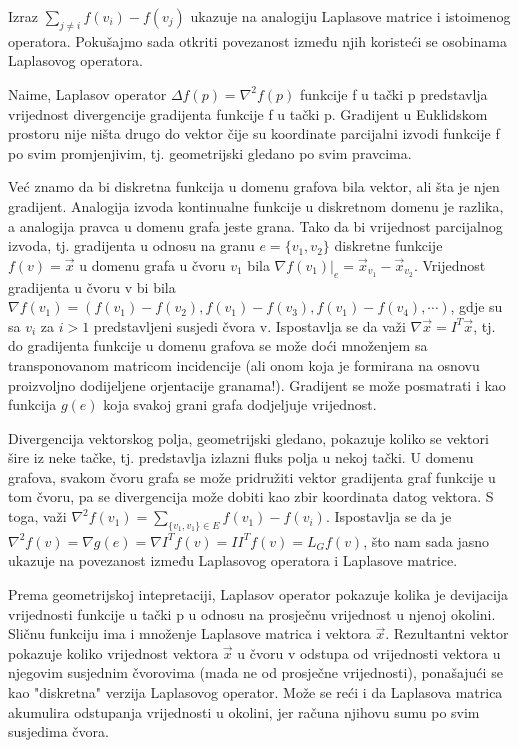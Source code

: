 \documentclass[11pt]{article}
\begin{document}
	Izraz $\sum_{ j \neq i}  f(v_i) - f(v_j)$ ukazuje na analogiju Laplasove matrice i istoimenog operatora.
	Pokušajmo sada otkriti povezanost između njih koristeći se osobinama Laplasovog operatora.

	Naime, Laplasov operator $\Delta f(p) = \nabla^2 f(p)$ funkcije f u tački p predstavlja vrijednost divergencije gradijenta funkcije f u tački p.
	Gradijent u Euklidskom prostoru nije ništa drugo do vektor čije su koordinate parcijalni izvodi funkcije f po svim promjenjivim, tj. geometrijski gledano po svim pravcima.
	
	Već znamo da bi diskretna funkcija u domenu grafova bila vektor, ali šta je njen gradijent. 
	Analogija izvoda kontinualne funkcije u diskretnom domenu je razlika, a analogija pravca u domenu grafa jeste grana. 
	Tako da bi vrijednost parcijalnog izvoda, tj. gradijenta u odnosu na granu $e=\{v_1,v_2\}$ diskretne funkcije $f(v) = \vec{x}$ u domenu grafa u čvoru $v_1$ bila $\nabla  f(v_1)|_e = \vec{x}_{v_1} - \vec{x}_{v_2}$.
	Vrijednost gradijenta u čvoru v bi bila $\nabla f(v_1) = (f(v_1) - f(v_2),f(v_1) - f(v_3),f(v_1) - f(v_4), \cdots)$, gdje su sa $v_i$ za $i>1$ predstavljeni susjedi čvora v.
	Ispostavlja se da važi $\nabla \vec{x} = I^T \vec{x}$, tj. do gradijenta funkcije u domenu grafova se može doći množenjem sa transponovanom matricom incidencije (ali onom koja je formirana na osnovu proizvoljno dodijeljene orjentacije granama!).
	Gradijent se može posmatrati i kao funkcija $g(e)$ koja svakoj grani grafa dodjeljuje vrijednost.
	
	Divergencija vektorskog polja, geometrijski gledano, pokazuje koliko se vektori šire iz neke tačke, tj. predstavlja izlazni fluks polja u nekoj tački.
	U domenu grafova, svakom čvoru grafa se može pridružiti vektor gradijenta graf funkcije u tom čvoru, pa se divergencija može dobiti kao zbir koordinata datog vektora.
	S toga, važi $\nabla^2 f(v_1) = \sum_{ \{v_1,v_1\} \in E} f(v_1) - f(v_i)$.
	Ispostavlja se da je $\nabla^2 f(v) = \nabla g(e) = \nabla I^T f(v) = I I^T f(v) = L_G f(v)$, što nam sada jasno ukazuje na povezanost između Laplasovog operatora i Laplasove matrice.

	Prema geometrijskoj intepretaciji, Laplasov operator pokazuje kolika je devijacija vrijednosti funkcije u tački p u odnosu na prosječnu vrijednost u njenoj okolini.
	Sličnu funkciju ima i množenje Laplasove matrica i vektora $\vec{x}$. Rezultantni vektor pokazuje koliko vrijednost vektora $\vec{x}$ u čvoru v odstupa od vrijednosti
	vektora u njegovim susjednim čvorovima (mada ne od prosječne vrijednosti), ponašajući se kao "diskretna" verzija Laplasovog operator. 
	Može se reći i da Laplasova matrica akumulira odstupanja vrijednosti u okolini, jer računa njihovu sumu po svim susjedima čvora.
\end{document}
